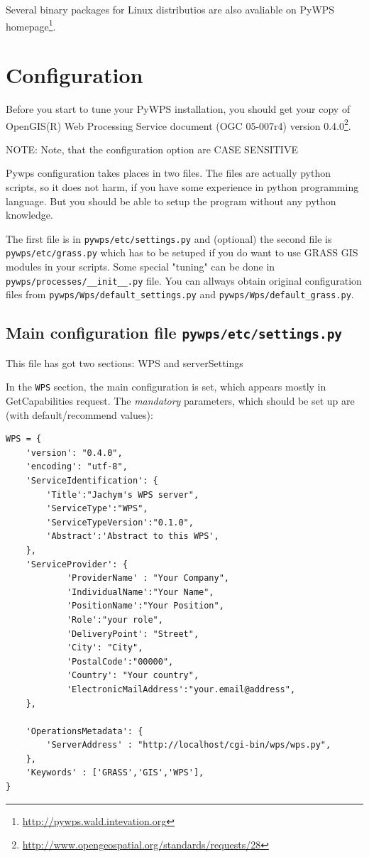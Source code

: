 \documentclass[a4paper,11pt]{article}
\newcommand{\pywpssite}{\url{http://pywps.wald.intevation.org}}
\newcommand{\note}[1]{\medskip{}\noindent{}NOTE: #1\medskip{}}
\begin{document}
Several binary packages for Linux distributios are also avaliable on PyWPS
homepage\footnote{\pywpssite}.

\section{Configuration}
\label{configuration}
    
Before you start to tune your PyWPS installation, you should get your copy of
OpenGIS(R) Web Processing Service document (OGC 05-007r4) version
0.4.0\footnote{\url{http://www.opengeospatial.org/standards/requests/28}}.
    
\note{Note, that the configuration option are CASE SENSITIVE}
    
Pywps configuration takes places in two files. The files are actually python
scripts, so it does not harm, if you have some experience in python
programming language. But you should be able to setup the program without
any python knowledge.

The first file is in \texttt{pywps/etc/settings.py} and (optional) the second file is
\texttt{pywps/etc/grass.py} which has to be setuped if you do want to use
GRASS GIS modules in your scripts. Some special "tuning" can be done in
\texttt{pywps/processes/\_\_init\_\_.py}
file. You can allways obtain original configuration files from
\texttt{pywps/Wps/default\_settings.py} and \texttt{pywps/Wps/default\_grass.py}.
    
\subsection{Main configuration file \texttt{pywps/etc/settings.py}}
    
This file has got two sections: WPS and serverSettings
    
In the \texttt{WPS} section, the main configuration is set, which appears mostly in
GetCapabilities request. The \emph{mandatory} parameters, which should be set up
are (with default/recommend values):
    

\begin{verbatim}
WPS = {
    'version': "0.4.0",
    'encoding': "utf-8",
    'ServiceIdentification': {
        'Title':"Jachym's WPS server",
        'ServiceType':"WPS",
        'ServiceTypeVersion':"0.1.0",
        'Abstract':'Abstract to this WPS',
    },
    'ServiceProvider': {
            'ProviderName' : "Your Company",
            'IndividualName':"Your Name",
            'PositionName':"Your Position",
            'Role':"your role",
            'DeliveryPoint': "Street",
            'City': "City",
            'PostalCode':"00000",
            'Country': "Your country",
            'ElectronicMailAddress':"your.email@address",
    },

    'OperationsMetadata': {
        'ServerAddress' : "http://localhost/cgi-bin/wps/wps.py",
    },
    'Keywords' : ['GRASS','GIS','WPS'],
}
\end{verbatim}
\end{document}
